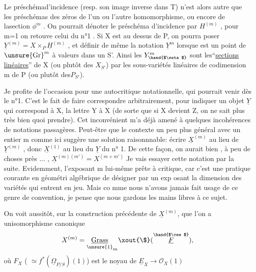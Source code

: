 
Le préschémad'incidence  (resp. son image inverse dans T) n'est alors
autre que les préschémas des zéros de l'un ou l'autre homomorphisme,
ou encore de lasection $\phi^{m}$ .  On pourrait dénoter le préschéma
d'incidence par $H^{(m)}$ , pour m=1 on retouve celui du n°1 .  Si X est
au dessus de P, on pourra poser $\underline{Y}^{(m)} = X\times_{P} \underline{H}^{(m)}$ ,  et définir de même
la notation $\underline{Y}^{m}$ lorsque \hand{$\zeta$} est un point de $\unsure{\mathrm{Gr}}^{m}$ à valeurs dans un S'.
Ainsi les  $Y^{m}_{\hand{$\zeta$}}$  sont les``\uline{sections} \uline{linéaires}''  de X  (ou plutôt des
$X_{S'}$)   par les sous-variétés linéaires de codimension m de P (ou
plutôt des$P_{S'}$).

\margin{$|$}Je profite de l'occasion pour une  autocritique notationnelle,
qui pourrait venir dès le n°1. C'est le fait  de faire correspondre
arbitrairement, pour indiquer un objet $\underline{Y}$ qui correspond à X, la lettre
Y à X  (de sorte que si X devient Z, on ne sait plus très bien quoi
prendre). Cet inconvénient m'a déjà amené à quelques incohérences de
notations passagères.  Peut-être que le contexte un peu plus général
avec un entier m comme ici suggère une solution raisonnnable: écrire
$\underline{X}^{(m)}$ au lieu de  $\underline{Y}^{(m)}$ , donc  $\underline{X}^{(1)}$ au lieu du  $\underline{Y}$  du n° 1. De cette
façon, on  aurait bien , à peu de choses près ... ,  $\underline{X}^{(m)(m')} = X^{(m+m')}$
Je vais essayer cette notation par la suite.  Evidemment, l'exposant m
lui-même prête à critique, car  c'est une pratique courante en géométri
algébrique de désigner par un exp osant la dimension des variétés qui
entrent en jeu. Mais co mme nous n'avons jamais fait usage de ce genre
de convention, je pense que nous gardons les mains libres à ce sujet.

On voit aussitôt, sur la construction précédente de $\underline{X}^{(m)}$, que
l'on a unisomorphisme canonique
\[ X^{(m)} = \underset{\unsure{1}}{\underline{\mathrm{Grass}}}_{m}\xout{\$}(\overset{\hand{$\vee$}}{\underline{F}}) , \]
où  $F_{X}$  ( $\simeq f^{*}(\underline{\Omega}_{P/S})(1)$)   est le noyau de  $\underline{E}_{X} \longrightarrow \mathcal{O}_{X}(1)$\hand{,}

